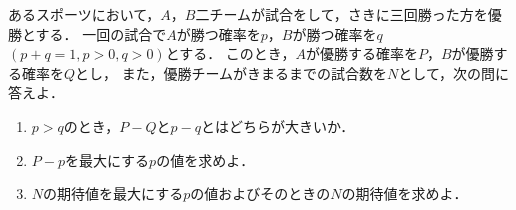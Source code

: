 \documentclass[../../main.tex]{subfiles}
\begin{document}
あるスポーツにおいて，$A$，$B$二チームが試合をして，さきに三回勝った方を優勝とする．
一回の試合で$A$が勝つ確率を$p$，$B$が勝つ確率を$q$ $(p+q=1,p>0,q>0)$とする．
このとき，$A$が優勝する確率を$P$，$B$が優勝する確率を$Q$とし，
また，優勝チームがきまるまでの試合数を$N$として，次の問に答えよ．
\begin{enumerate}
  \item $p>q$のとき，$P-Q$と$p-q$とはどちらが大きいか．
  \item $P-p$を最大にする$p$の値を求めよ．
  \item $N$の期待値を最大にする$p$の値およびそのときの$N$の期待値を求めよ．
\end{enumerate}
\end{document}
